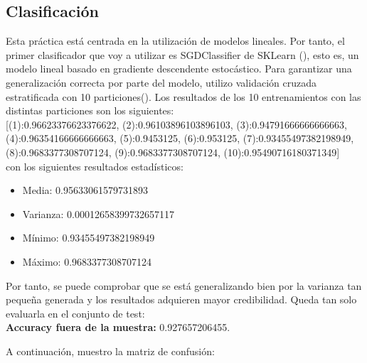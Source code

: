 \subsection{Clasificación}

Esta práctica está centrada en la utilización de modelos lineales. Por tanto, el primer clasificador que voy a utilizar es SGDClassifier de SKLearn (\cite{SGD-C}), esto  es, un modelo lineal basado en gradiente descendente estocástico. Para garantizar una generalización correcta por parte del modelo, utilizo validación cruzada estratificada con 10 particiones(\cite{stk}). Los resultados de los 10 entrenamientos con las distintas particiones son los siguientes: \\

[(1):0.96623376623376622, (2):0.96103896103896103, (3):0.94791666666666663, (4):0.96354166666666663, (5):0.9453125, (6):0.953125, (7):0.93455497382198949, (8):0.9683377308707124, (9):0.9683377308707124, (10):0.95490716180371349] \\


con los siguientes resultados estadísticos:

\begin{itemize}
	\item Media: 0.95633061579731893
	\item Varianza: 0.00012658399732657117
	\item Mínimo: 0.93455497382198949
	\item Máximo: 0.9683377308707124
\end{itemize}

Por tanto, se puede comprobar que se está generalizando bien por la varianza tan pequeña generada y los resultados adquieren mayor credibilidad. Queda tan solo evaluarla en el conjunto de test: \\

\textbf{Accuracy fuera de la muestra:} 0.927657206455.

A continuación, muestro la matriz de confusión:

